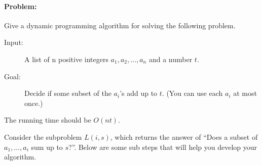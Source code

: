\documentclass[12pt]{article}
\newcommand{\BigO}[1]{\ensuremath{O(#1)}}
\begin{document}
\paragraph{Problem:}
Give a dynamic programming algorithm for solving the following problem.
\begin{description}
    \item [Input:] A list of n positive integers $a_1, a_2 , \dots, a_n$ and a number $t$.
    \item [Goal:] Decide if some subset of the $a_i$’s add up to $t$. (You can use each $a_i$ at most once.)
\end{description}
The running time should be $\BigO{nt}$.

Consider the subproblem $L(i, s)$, which returns the answer of “Does a
subset of $a_1, \dots, a_i$ sum up to $s$?”.  Below are some sub steps
that will help you develop your algorithm.  
\end{document}
